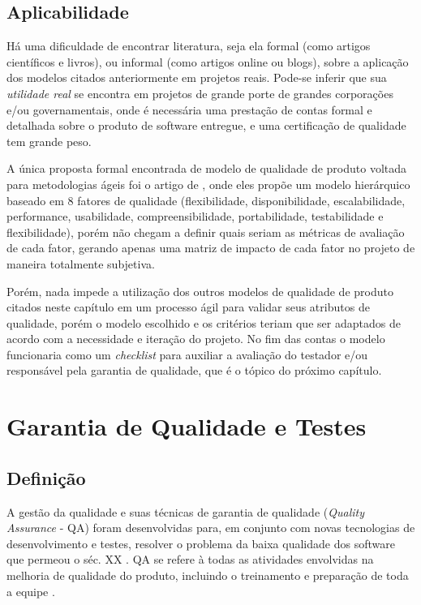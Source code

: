\documentclass[
	12pt,				%
	openright,			%
	oneside,			%
	a4paper,			%
	english,			%
	brazil,				%
	]{abntex2}
\begin{document}
\section{Aplicabilidade}
Há uma dificuldade de encontrar literatura, seja ela formal (como artigos científicos e livros), ou informal (como artigos online ou blogs), sobre a aplicação dos modelos citados anteriormente em projetos reais. Pode-se inferir que sua \emph{utilidade real} se encontra em projetos de grande porte de grandes corporações e/ou governamentais, onde é necessária uma prestação de contas formal e detalhada sobre o produto de software entregue, e uma certificação de qualidade tem grande peso.

A única proposta formal encontrada de modelo de qualidade de produto voltada para metodologias ágeis foi o artigo de , onde eles propõe um modelo hierárquico baseado em 8 fatores de qualidade (flexibilidade, disponibilidade, escalabilidade, performance, usabilidade, compreensibilidade, portabilidade, testabilidade e flexibilidade), porém não chegam a definir quais seriam as métricas de avaliação de cada fator, gerando apenas uma matriz de impacto de cada fator no projeto de maneira totalmente subjetiva.

Porém, nada impede a utilização dos outros modelos de qualidade de produto citados neste capítulo em um processo ágil para validar seus atributos de qualidade, porém o modelo escolhido e os critérios teriam que ser adaptados de acordo com a necessidade e iteração do projeto. No fim das contas o modelo funcionaria como um \emph{checklist} para auxiliar a avaliação do testador e/ou responsável pela garantia de qualidade, que é o tópico do próximo capítulo.

\chapter{Garantia de Qualidade e Testes}

\section{Definição}
A gestão da qualidade e suas técnicas de garantia de qualidade (\emph{Quality Assurance} - QA) foram desenvolvidas para, em conjunto com novas tecnologias de desenvolvimento e testes, resolver o problema da baixa qualidade dos software que permeou o séc. XX \cite{SOMMERVILLE2011}. QA se refere à todas as atividades envolvidas na melhoria de qualidade do produto, incluindo o treinamento e preparação de toda a equipe \cite{tsui2013}.
\end{document}
